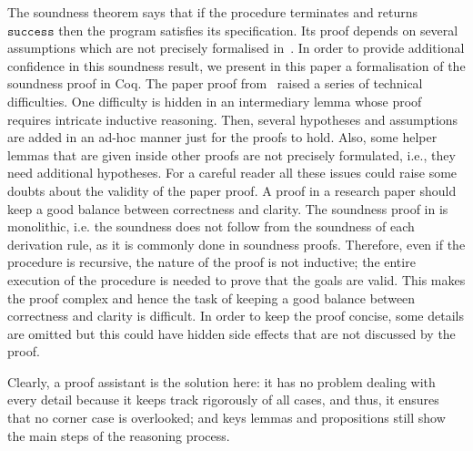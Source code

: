\documentclass[conference]{IEEEtran}
\newenvironment{todo}{\medskip\hrule\smallskip\noindent}{\smallskip\hrule\medskip}
\newcommand{\dl}[1]{\begin{todo}\textcolor{blue}{Dorel:}\\ \color{red}{#1}\color{black}\end{todo}}
\newcommand{\dl}[1]{}
\newcommand{\success}{\mathtt{success}}
\begin{document}
The soundness theorem says that if the procedure terminates and returns $\success$ then the program satisfies its specification. %
Its proof depends on several assumptions which are not precisely formalised in~\cite{lucanu-rusu-arusoaie-nowak-LRC2015}.
In order to provide additional confidence in this soundness result, we present in this paper  a formalisation of the soundness proof in Coq.
The paper proof from~\cite{lucanu-rusu-arusoaie-nowak-LRC2015} raised a series of technical difficulties.
One difficulty is hidden in an intermediary lemma whose proof requires intricate inductive reasoning. 
Then, several hypotheses and assumptions are added in an ad-hoc  manner just for the proofs to hold.
Also, some helper lemmas that are given inside other proofs are not precisely formulated, i.e., they need additional hypotheses.
For a careful reader all these issues could raise some doubts about the validity of the paper proof.
A proof in a research paper should keep a good balance between correctness and clarity. The soundness proof in \cite{lucanu-rusu-arusoaie-nowak-LRC2015} is monolithic, i.e. the soundness does not follow from the soundness of each derivation rule, as it
is commonly done in soundness proofs. Therefore, even if the procedure is recursive, the nature of the proof is not inductive; the entire execution of the procedure is needed to prove that the goals are valid. This makes the proof complex and hence the task of keeping a good balance between correctness and clarity is difficult. In order to keep the proof concise, some details are omitted but this could have hidden side effects that are not discussed by the proof.

Clearly, a proof assistant is the solution here: it has no problem dealing with every detail because it keeps track rigorously of all cases, and thus, it  ensures that no corner case is overlooked; and keys lemmas and propositions still show the main steps of the reasoning process.
\end{document}
